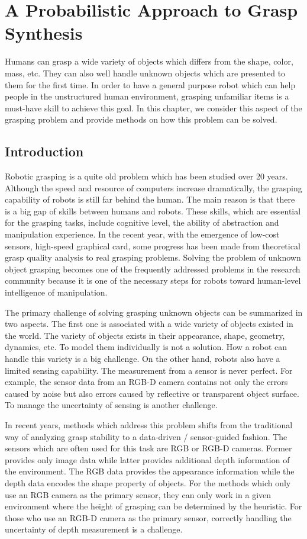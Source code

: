 \chapter{A Probabilistic Approach to Grasp Synthesis}
\label{chapter:gs}
Humans can grasp a wide variety of objects which differs from the shape, color, mass, etc. They can also well handle unknown objects which are presented to them for the first time. In order to have a general purpose robot which can help people in the unstructured human environment, grasping unfamiliar items is a must-have skill to achieve this goal. In this chapter, we consider this aspect of the grasping problem and provide methods on how this problem can be solved. 

\section{Introduction}
Robotic grasping is a quite old problem which has been studied over 20 years. Although the speed and resource of computers increase dramatically, the grasping capability of robots is still far behind the human. The main reason is that there is a big gap of skills between humans and robots. These skills, which are essential for the grasping tasks, include cognitive level, the ability of abstraction and manipulation experience. In the recent year, with the emergence of low-cost sensors, high-speed graphical card, some progress has been made from theoretical grasp quality analysis to real grasping problems. Solving the problem of unknown object grasping becomes one of the frequently addressed problems in the research community because it is one of the necessary steps for robots toward human-level intelligence of manipulation.

The primary challenge of solving grasping unknown objects can be summarized in two aspects. The first one is associated with a wide variety of objects existed in the world. The variety of objects exists  in their appearance, shape, geometry, dynamics, etc. To model them individually is not a solution. How a robot can handle this variety is a big challenge. On the other hand, robots also have a limited sensing capability. The measurement from a sensor is never perfect. For example, the sensor data from an RGB-D camera contains not only the errors caused by noise but also errors caused by reflective or transparent object surface. To manage the uncertainty of sensing is another challenge. 
  
In recent years, methods which address this problem shifts from the traditional way of analyzing grasp stability to a data-driven / sensor-guided fashion. The  sensors which are often used for this task are RGB or RGB-D cameras. Former provides only image data while latter provides additional depth information of the environment. The RGB data provides the appearance information while the depth data encodes the shape property of objects. For the methods which only use an RGB camera as the primary sensor, they can only work in a given environment where the height of  grasping can be determined by the heuristic. For those who use an RGB-D camera as the primary sensor, correctly handling the uncertainty of depth measurement is a challenge. 

